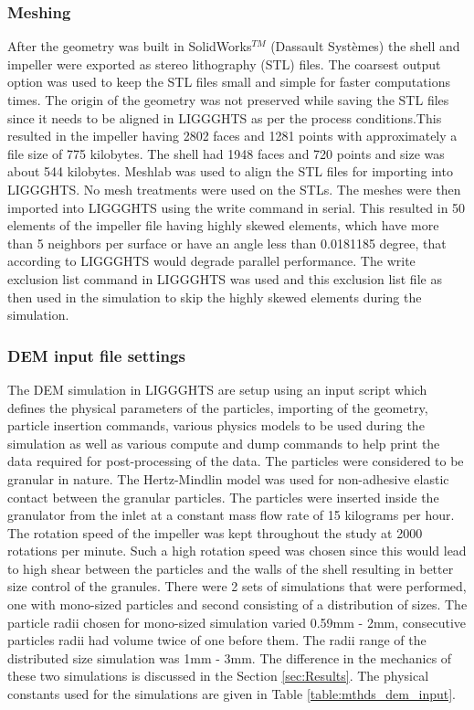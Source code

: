 \documentclass[preprint,11pt,authoryear]{elsarticle}
\begin{document}
\subsubsection{Meshing}
 After the geometry was built in SolidWorks$^{TM}$ (Dassault Syst\`{e}mes) the shell and impeller 
were exported as stereo lithography (STL) files. The coarsest output option was used to keep the STL files 
small and simple for faster computations times. The origin of the geometry was not preserved while saving 
the STL files since it needs to be aligned in LIGGGHTS as per the process conditions.This resulted in 
the impeller having 2802 faces and 1281 points with approximately a file size of 775 kilobytes. 
The shell had 1948 faces and 720 points and size was about 544 kilobytes. Meshlab was used to 
align the STL files for importing into LIGGGHTS. No mesh treatments were used on the STLs. 
The meshes were then imported into LIGGGHTS using the write command in serial. This resulted 
in 50 elements of the impeller file having highly skewed elements, which have more than 5 
neighbors per surface or have an angle less than 0.0181185 degree, that according to LIGGGHTS 
would degrade parallel performance. The write exclusion list command in LIGGGHTS was used and 
this exclusion list file as then used in the simulation to skip the highly skewed elements during 
the simulation. 


\subsubsection{DEM input file settings}
The DEM simulation in LIGGGHTS are setup using an input script which defines the physical 
parameters of the particles, importing of the geometry, particle insertion commands, various physics 
models to be used during the simulation as well as various compute and dump commands to help print 
the data required for post-processing of the data. The particles were considered to be granular in 
nature. The Hertz-Mindlin model was used for non-adhesive elastic contact between the granular particles. 
The particles were inserted inside the granulator from the inlet at a constant mass flow rate of 15 
kilograms per hour. The rotation speed of the impeller was kept throughout the study at 2000 rotations 
per minute. Such a high rotation speed was chosen since this would lead to high shear between the 
particles and the walls of the shell resulting in better size control of the granules. There were 2 sets of 
simulations that were performed, one with mono-sized particles and second consisting of a distribution 
of sizes. The particle radii chosen for mono-sized simulation varied 0.59mm - 2mm, consecutive 
particles radii had volume twice of one before them. The radii range of the distributed size simulation 
was 1mm - 3mm. The difference in the mechanics of these two simulations is discussed in the Section \ref{sec:Results}. 
The physical constants used for the simulations are given in Table 
\ref{table:mthds_dem_input}.
\end{document}
